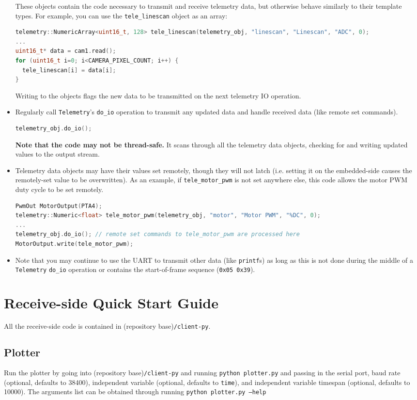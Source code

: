 \documentclass[11pt]{article}
\begin{document}
\begin{itemize}
  These objects contain the code necessary to transmit and receive telemetry data, but otherwise behave similarly to their template types. For example, you can use the \texttt{tele\_linescan} object as an array:
\begin{lstlisting}[language=C++]
telemetry::NumericArray<uint16_t, 128> tele_linescan(telemetry_obj, "linescan", "Linescan", "ADC", 0);  
...
uint16_t* data = cam1.read();
for (uint16_t i=0; i<CAMERA_PIXEL_COUNT; i++) {
  tele_linescan[i] = data[i];
}
\end{lstlisting}
  Writing to the objects flags the new data to be transmitted on the next telemetry IO operation.
  \item Regularly call \texttt{Telemetry}'s \texttt{do\_io} operation to transmit any updated data and handle received data (like remote set commands).
\begin{lstlisting}[language=C++]
telemetry_obj.do_io();
\end{lstlisting}
  \textbf{Note that the code may not be thread-safe.} It scans through all the telemetry data objects, checking for and writing updated values to the output stream.
  \item Telemetry data objects may have their values set remotely, though they will not latch (i.e. setting it on the embedded-side causes the remotely-set value to be overwritten). As an example, if \texttt{tele\_motor\_pwm} is not set anywhere else, this code allows the motor PWM duty cycle to be set remotely.
\begin{lstlisting}[language=C++]
PwmOut MotorOutput(PTA4);
telemetry::Numeric<float> tele_motor_pwm(telemetry_obj, "motor", "Motor PWM", "%DC", 0);
...
telemetry_obj.do_io(); // remote set commands to tele_motor_pwm are processed here
MotorOutput.write(tele_motor_pwm);
\end{lstlisting}
  \item Note that you may continue to use the UART to transmit other data (like \texttt{printf}s) as long as this is not done during the middle of a \texttt{Telemetry} \texttt{do\_io} operation or contains the start-of-frame sequence (\texttt{0x05 0x39}).
\end{itemize}

\section{Receive-side Quick Start Guide}
All the receive-side code is contained in (repository base)\texttt{/client-py}.
\subsection{Plotter}
Run the plotter by going into (repository base)\texttt{/client-py} and running \texttt{python plotter.py} and passing in the serial port, baud rate (optional, defaults to 38400), independent variable (optional, defaults to \texttt{time}), and independent variable timespan (optional, defaults to 10000). The arguments list can be obtained through running \texttt{python plotter.py --help}
\end{document}
